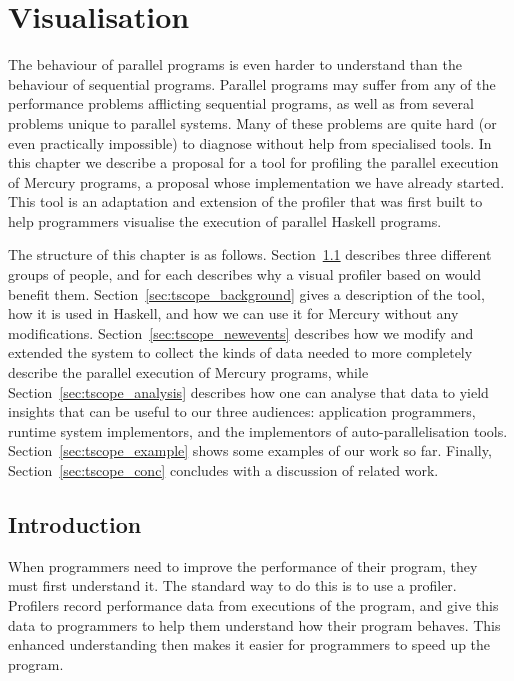
\chapter{Visualisation}
\label{chap:tscope}

\newcommand{\event}[1]{\code{#1}\xspace}
\newcommand{\metric}[1]{\textsc{#1}\xspace}
\newcommand{\metrictopic}[1]{\textbf{\textsc{#1}}\xspace}


The behaviour of parallel programs is even harder to understand
than the behaviour of sequential programs.
Parallel programs may suffer from
any of the performance problems afflicting sequential programs,
as well as from several problems unique to parallel systems.
Many of these problems are quite hard
(or even practically impossible)
to diagnose without help from specialised tools.
In this chapter we describe a proposal for a tool
for profiling the parallel execution of Mercury programs,
a proposal whose implementation we have already started.
This tool is an adaptation and extension of the \tscope profiler
that was first built to help programmers visualise
the execution of parallel Haskell programs.

The structure of this chapter is as follows.
Section~\ref{sec:tscope_intro} describes three different groups of people,
and for each describes why a visual profiler based on \tscope would benefit
them.
Section~\ref{sec:tscope_background} gives a description of the \tscope tool,
how it is used in Haskell,
and how we can use it for Mercury without any modifications.
Section~\ref{sec:tscope_newevents}
describes how we modify and extended the \tscope system
to collect the kinds of data needed to more completely describe
the parallel execution of Mercury programs,
while Section~\ref{sec:tscope_analysis} describes how
one can analyse that data to yield insights
that can be useful to our three audiences:
application programmers,
runtime system implementors,
and the implementors of auto-parallelisation tools.
Section~\ref{sec:tscope_example} shows some examples of our work so far.
Finally, Section~\ref{sec:tscope_conc}
concludes with a discussion of related work.

\section{Introduction}
\label{sec:tscope_intro}

When programmers need to improve the performance of their program,
they must first understand it.
The standard way to do this is to use a profiler.
Profilers record performance data from executions of the program,
and give this data to programmers
to help them understand how their program behaves.
This enhanced understanding then makes it easier
for programmers to speed up the program.

